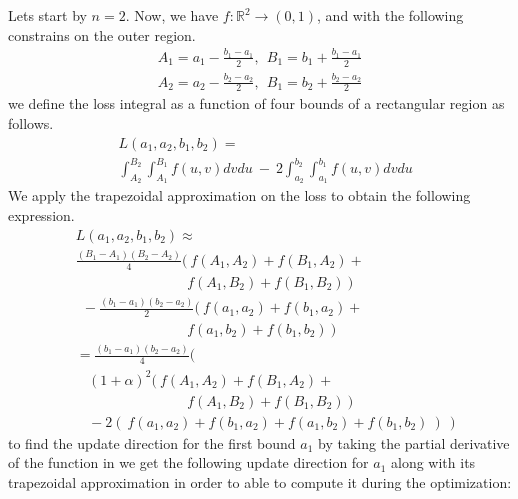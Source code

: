 Lets start by $n=2$. Now, we have $f: \mathbb{R}^{2} \rightarrow (0,1)$, and with the following constrains on the outer region.
\begin{equation}
\begin{aligned} 
 A_1 =  a_{1}-\frac{b_{1}-a_{1}}{2} ,~~  B_1 =  b_{1}+\frac{b_{1}-a_{1}}{2} \\
  A_2 =  a_{2}-\frac{b_{2}-a_{2}}{2} ,~~  B_1 =  b_{2}+\frac{b_{2}-a_{2}}{2}
\label{eq:fixed-assumption-2}
\end{aligned}
\end{equation}
we define the loss integral as a function of four bounds of a rectangular region as follows.
\begin{equation}
\begin{aligned} 
&L(a_{1},a_{2},b_{1},b_{2}) =\\ &  \int_{A_2}^{B_2}\int_{A_1}^{B_1}f(u,v)dvdu ~- ~2  \int_{a_{2}}^{b_{2}}\int_{a_{1}}^{b_{1}}f(u,v)dvdu 
\label{eq:outer-integration2}
\end{aligned}
\end{equation}
We apply the trapezoidal approximation on the loss to obtain the following expression. 
\begin{equation}
\begin{aligned} 
&L(a_{1},a_{2},b_{1},b_{2}) \approx \\ 
& \frac{(B_{1}-A_{1})(B_{2}-A_{2})}{4}(~f(A_{1},A_{2})+f(B_{1},A_{2})+ \\ &~~~~~~~~~~~~~~~~~~~~~~~~~~~~~~~~~~~~f(A_{1},B_{2})+f(B_{1},B_{2})~)\\
&~~- \frac{(b_{1}-a_{1})(b_{2}-a_{2})}{2}(~f(a_{1},a_{2})+f(b_{1},a_{2})+\\ &~~~~~~~~~~~~~~~~~~~~~~~~~~~~~~~~~~~~f(a_{1},b_{2})+f(b_{1},b_{2})~) \\
&= \frac{(b_{1}-a_{1})(b_{2}-a_{2})}{4}( \\
&~~~~(1+ \alpha )^2 (~f(A_{1},A_{2})+f(B_{1},A_{2})+ \\ &~~~~~~~~~~~~~~~~~~~~~~~~~~~~~~~~~~~~f(A_{1},B_{2})+f(B_{1},B_{2})~)\\
&~~~~- 2(~f(a_{1},a_{2})+f(b_{1},a_{2})+f(a_{1},b_{2})+f(b_{1},b_{2})~)~~)
\label{eq:outer-integration3}
\end{aligned}
\end{equation}
to find the update direction for the first bound $a_1$ by taking the partial derivative of the function in \eqLabel{\ref{eq:outer-integration2}} we get the following update direction for $a_1$ along with its trapezoidal approximation in order to able to compute it during the optimization:
